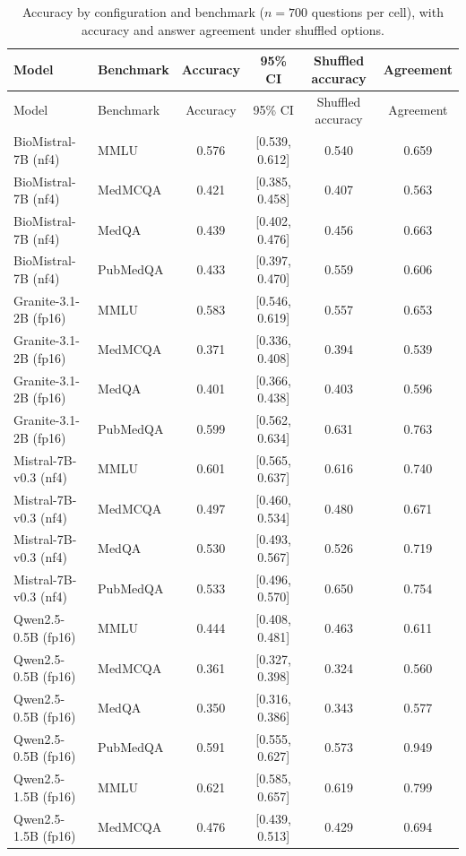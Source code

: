 \documentclass[11pt]{article}
\theoremstyle{plain}
\theoremstyle{definition}
\begin{document}
{\small
\begin{longtable}{llcccc}
\caption{Accuracy by configuration and benchmark ($n = 700$ questions per cell), with accuracy and answer agreement under shuffled options.}
\label{tab:accuracy} \\
\toprule
Model & Benchmark & Accuracy & 95\% CI & Shuffled accuracy & Agreement \\
\midrule
\endfirsthead
\toprule
Model & Benchmark & Accuracy & 95\% CI & Shuffled accuracy & Agreement \\
\midrule
\endhead
\bottomrule
\endfoot
BioMistral-7B (nf4) & MMLU & 0.576 & {[0.539, 0.612]} & 0.540 & 0.659 \\
BioMistral-7B (nf4) & MedMCQA & 0.421 & {[0.385, 0.458]} & 0.407 & 0.563 \\
BioMistral-7B (nf4) & MedQA & 0.439 & {[0.402, 0.476]} & 0.456 & 0.663 \\
BioMistral-7B (nf4) & PubMedQA & 0.433 & {[0.397, 0.470]} & 0.559 & 0.606 \\
\midrule
Granite-3.1-2B (fp16) & MMLU & 0.583 & {[0.546, 0.619]} & 0.557 & 0.653 \\
Granite-3.1-2B (fp16) & MedMCQA & 0.371 & {[0.336, 0.408]} & 0.394 & 0.539 \\
Granite-3.1-2B (fp16) & MedQA & 0.401 & {[0.366, 0.438]} & 0.403 & 0.596 \\
Granite-3.1-2B (fp16) & PubMedQA & 0.599 & {[0.562, 0.634]} & 0.631 & 0.763 \\
\midrule
Mistral-7B-v0.3 (nf4) & MMLU & 0.601 & {[0.565, 0.637]} & 0.616 & 0.740 \\
Mistral-7B-v0.3 (nf4) & MedMCQA & 0.497 & {[0.460, 0.534]} & 0.480 & 0.671 \\
Mistral-7B-v0.3 (nf4) & MedQA & 0.530 & {[0.493, 0.567]} & 0.526 & 0.719 \\
Mistral-7B-v0.3 (nf4) & PubMedQA & 0.533 & {[0.496, 0.570]} & 0.650 & 0.754 \\
\midrule
Qwen2.5-0.5B (fp16) & MMLU & 0.444 & {[0.408, 0.481]} & 0.463 & 0.611 \\
Qwen2.5-0.5B (fp16) & MedMCQA & 0.361 & {[0.327, 0.398]} & 0.324 & 0.560 \\
Qwen2.5-0.5B (fp16) & MedQA & 0.350 & {[0.316, 0.386]} & 0.343 & 0.577 \\
Qwen2.5-0.5B (fp16) & PubMedQA & 0.591 & {[0.555, 0.627]} & 0.573 & 0.949 \\
\midrule
Qwen2.5-1.5B (fp16) & MMLU & 0.621 & {[0.585, 0.657]} & 0.619 & 0.799 \\
Qwen2.5-1.5B (fp16) & MedMCQA & 0.476 & {[0.439, 0.513]} & 0.429 & 0.694 \\

\end{longtable}}
\end{document}
